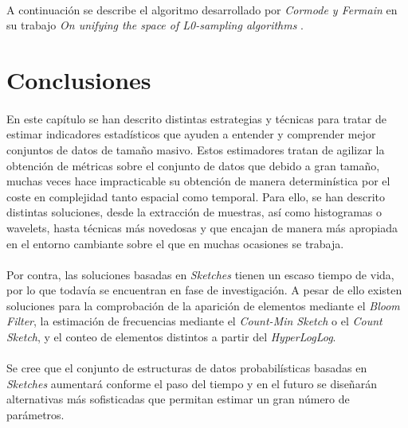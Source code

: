 \documentclass{subfiles}
\begin{document}
      \paragraph{}
      A continuación se describe el algoritmo desarrollado por \emph{Cormode y Fermain} en su trabajo \emph{On unifying the space of L0-sampling algorithms}  \cite{cormode2013unifying}.


    \section{Conclusiones}
    \label{sec:summaries_conclusions}

      \paragraph{}
      En este capítulo se han descrito distintas estrategias y técnicas para tratar de estimar indicadores estadísticos que ayuden a entender y comprender mejor conjuntos de datos de tamaño masivo. Estos estimadores tratan de agilizar la obtención de métricas sobre el conjunto de datos que debido a gran tamaño, muchas veces hace impracticable su obtención de manera determinística por el coste en complejidad tanto espacial como temporal. Para ello, se han descrito distintas soluciones, desde la extracción de muestras, así como histogramas o wavelets, hasta técnicas más novedosas y que encajan de manera más apropiada en el entorno cambiante sobre el que en muchas ocasiones se trabaja.

      \paragraph{}
      Por contra, las soluciones basadas en \emph{Sketches} tienen un escaso tiempo de vida, por lo que todavía se encuentran en fase de investigación. A pesar de ello existen soluciones para la comprobación de la aparición de elementos mediante el \emph{Bloom Filter}, la estimación de frecuencias mediante el \emph{Count-Min Sketch} o el \emph{Count Sketch}, y el conteo de elementos distintos a partir del \emph{HyperLogLog}.

      \paragraph{}
      Se cree que el conjunto de estructuras de datos probabilísticas basadas en \emph{Sketches} aumentará conforme el paso del tiempo y en el futuro se diseñarán alternativas más sofisticadas que permitan estimar un gran número de parámetros.
\end{document}
